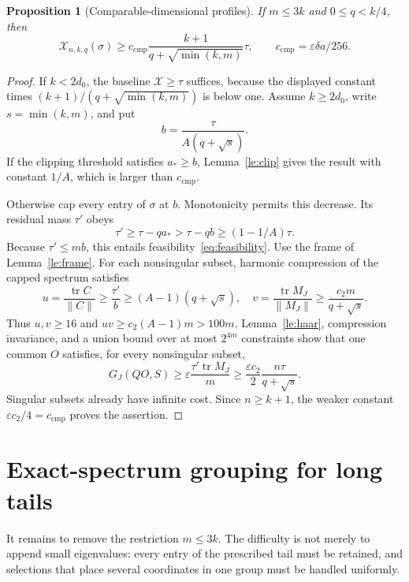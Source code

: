 \documentclass[11pt]{article}
\newtheorem{proposition}[theorem]{Proposition}
\theoremstyle{remark}\newtheorem{remark}[theorem]{Remark}
\newcommand{\tr}{\operatorname{tr}}
\newcommand{\X}{\mathcal X}
\newcommand{\eps}{\varepsilon}
\begin{document}
\begin{proposition}[Comparable-dimensional profiles]\label{pr:comparable}
If $m\le3k$ and $0\le q<k/4$, then
\begin{equation}\label{eq:comparable}
 \X_{n,k,q}(\sigma)\ge
 c_{\mathrm{cmp}}\frac{k+1}{q+\sqrt{\min(k,m)}}\tau,
 \qquad c_{\mathrm{cmp}}=\eps\delta a/256.
\end{equation}
\end{proposition}
\begin{proof}
If $k<2d_0$, the baseline $\X\ge\tau$ suffices, because the displayed constant times $(k+1)/(q+\sqrt{\min(k,m)})$ is below one. Assume $k\ge2d_0$, write $s=\min(k,m)$, and put
\[
 b=\frac{\tau}{A(q+\sqrt s)}.
\]
If the clipping threshold satisfies $a_*\ge b$, Lemma~\ref{le:clip} gives the result with constant $1/A$, which is larger than $c_{\mathrm{cmp}}$.

Otherwise cap every entry of $\sigma$ at $b$. Monotonicity permits this decrease. Its residual mass $\tau'$ obeys
\[
 \tau'\ge\tau-q a_*>\tau-qb\ge(1-1/A)\tau.
\]
Because $\tau'\le mb$, this entails feasibility~\eqref{eq:feasibility}. Use the frame of Lemma~\ref{le:frame}. For each nonsingular subset, harmonic compression of the capped spectrum satisfies
\[
 u=\frac{\tr C}{\|C\|}\ge\frac{\tau'}b
 \ge(A-1)(q+\sqrt s),
 \quad
 v=\frac{\tr M_J}{\|M_J\|}\ge\frac{c_2m}{q+\sqrt s}.
\]
Thus $u,v\ge16$ and $uv\ge c_2(A-1)m>100m$. Lemma~\ref{le:haar}, compression invariance, and a union bound over at most $2^{4m}$ constraints show that one common $O$ satisfies, for every nonsingular subset,
\[
 G_J(QO,S)\ge\eps\frac{\tau'\tr M_J}{m}
 \ge\frac{\eps c_2}{2}\frac{n\tau}{q+\sqrt s}.
\]
Singular subsets already have infinite cost. Since $n\ge k+1$, the weaker constant $\eps c_2/4=c_{\mathrm{cmp}}$ proves the assertion.
\end{proof}

\section{Exact-spectrum grouping for long tails}\label{sec:grouping}
It remains to remove the restriction $m\le3k$. The difficulty is not merely to append small eigenvalues: every entry of the prescribed tail must be retained, and selections that place several coordinates in one group must be handled uniformly.
\end{document}

